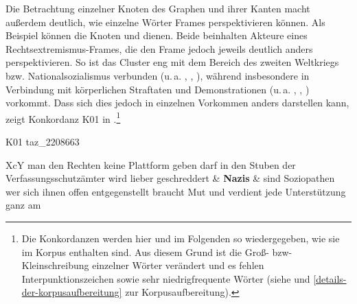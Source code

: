 Die Betrachtung einzelner Knoten des Graphen und ihrer Kanten macht außerdem deutlich, wie einzelne Wörter Frames perspektivieren können. Als Beispiel können die Knoten  und  dienen. Beide beinhalten Akteure eines Rechtsextremismus-Frames, die den Frame jedoch jeweils deutlich anders perspektivieren. So ist das Cluster  eng mit dem Bereich des zweiten Weltkriegs bzw. Nationalsozialismus verbunden (u.\,a. , , ), während  insbesondere in Verbindung mit körperlichen Straftaten und Demonstrationen (u.\,a. , , ) vorkommt. Dass sich dies jedoch in einzelnen Vorkommen anders darstellen kann, zeigt Konkordanz K01 in .\footnote{Die Konkordanzen werden hier und im Folgenden so wiedergegeben, wie sie im Korpus enthalten sind. Aus diesem Grund ist die Groß- bzw- Kleinschreibung einzelner Wörter verändert und es fehlen Interpunktionszeichen sowie sehr niedrigfrequente Wörter (siehe  und \ref{details-der-korpusaufbereitung} zur Korpusaufbereitung).}

\begin{table}
  \caption{Konkordanz zum Ausdruck \emph{Nazis}.}
  \label{tab:K01}
K01 taz\_2208663
\begin{tabularx}{\textwidth}{XcY}
\toprule
man den Rechten keine Plattform geben darf in den Stuben der Verfassungsschutzämter wird lieber geschreddert & \textbf{Nazis} & sind Soziopathen wer sich ihnen offen entgegenstellt braucht Mut und verdient jede Unterstützung ganz am \\
\bottomrule
\end{tabularx}
\end{table}


